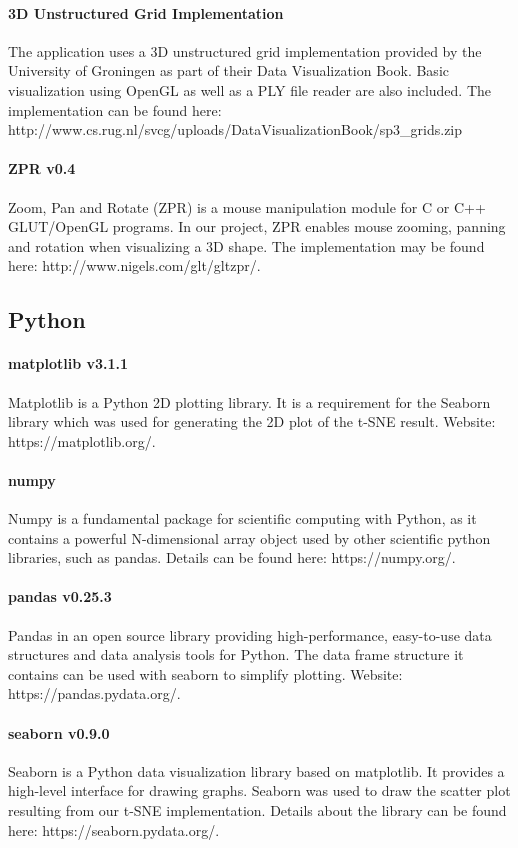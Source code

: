 \documentclass{bigdata}
\begin{document}
\paragraph{3D Unstructured Grid Implementation}
The application uses a 3D unstructured grid implementation provided by the University of Groningen as part of their Data Visualization Book. Basic visualization using OpenGL as well as a PLY file reader are also included. The implementation can be found here: http://www.cs.rug.nl/svcg/uploads/DataVisualizationBook/sp3\_grids.zip
\paragraph{ZPR v0.4}
Zoom, Pan and Rotate (ZPR) is a mouse manipulation module for C or C++ GLUT/OpenGL programs. In our project, ZPR enables mouse zooming, panning and rotation when visualizing a 3D shape. The implementation may be found here: http://www.nigels.com/glt/gltzpr/.

\subsection{Python}
\paragraph{matplotlib v3.1.1}
Matplotlib is a Python 2D plotting library. It is a requirement for the Seaborn library which was used for generating the 2D plot of the t-SNE result. Website: https://matplotlib.org/.
\paragraph{numpy}
Numpy is a fundamental package for scientific computing with Python, as it contains a powerful N-dimensional array object used by other scientific python libraries, such as pandas. Details can be found here: https://numpy.org/.
\paragraph{pandas v0.25.3}
Pandas in an open source library providing high-performance, easy-to-use data structures and data analysis tools for Python. The data frame structure it contains can be used with seaborn to simplify plotting. Website: https://pandas.pydata.org/.
\paragraph{seaborn v0.9.0}
Seaborn is a Python data visualization library based on matplotlib. It provides a high-level interface for drawing graphs. Seaborn was used to draw the scatter plot resulting from our t-SNE implementation. Details about the library can be found here: https://seaborn.pydata.org/.
\end{document}

